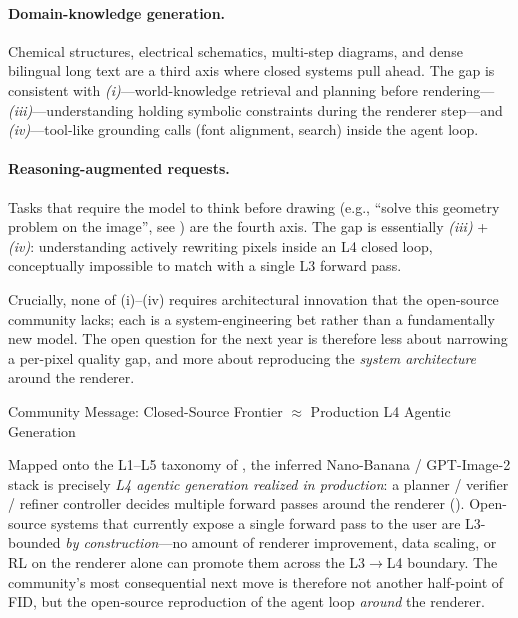 \documentclass{llmxive}
\begin{document}
\paragraph{Domain-knowledge generation.}
Chemical structures, electrical schematics, multi-step diagrams, and dense bilingual long text are a third axis where closed systems pull ahead. The gap is consistent with \emph{(i)}---world-knowledge retrieval and planning before rendering---\emph{(iii)}---understanding holding symbolic constraints during the renderer step---and \emph{(iv)}---tool-like grounding calls (font alignment, search) inside the agent loop.

\paragraph{Reasoning-augmented requests.}
Tasks that require the model to think before drawing (e.g., ``solve this geometry problem on the image'', see ) are the fourth axis. The gap is essentially \emph{(iii)} + \emph{(iv)}: understanding actively rewriting pixels inside an L4 closed loop, conceptually impossible to match with a single L3 forward pass.

Crucially, none of (i)--(iv) requires architectural innovation that the open-source community lacks; each is a system-engineering bet rather than a fundamentally new model. The open question for the next year is therefore less about narrowing a per-pixel quality gap, and more about reproducing the \emph{system architecture} around the renderer.

\begin{highlightbox}{Community Message: Closed-Source Frontier $\approx$ Production L4 Agentic Generation}

Mapped onto the L1--L5 taxonomy of , the inferred Nano-Banana / GPT-Image-2 stack is precisely \emph{L4 agentic generation realized in production}: a planner / verifier / refiner controller decides multiple forward passes around the renderer (). Open-source systems that currently expose a single forward pass to the user are L3-bounded \emph{by construction}---no amount of renderer improvement, data scaling, or RL on the renderer alone can promote them across the L3$\to$L4 boundary. The community's most consequential next move is therefore not another half-point of FID, but the open-source reproduction of the agent loop \emph{around} the renderer.
\end{highlightbox}
\end{document}
